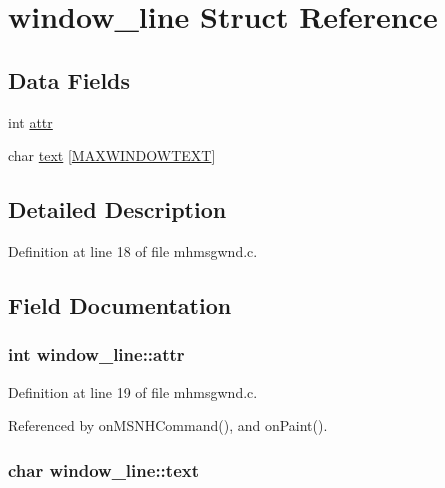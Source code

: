 \hypertarget{structwindow__line}{\section{window\+\_\+line Struct Reference}
\label{structwindow__line}
}
\subsection*{Data Fields}
\begin{DoxyCompactItemize}
\item 
int \hyperlink{structwindow__line_a58077cb852250ed547bc6cfd0310db23}{attr}
\item 
char \hyperlink{structwindow__line_a080d799babb8e16480b257e64df3d660}{text} \mbox{[}\hyperlink{win_2win32_2mhstatus_8c_a7823f335c74115317a5e71c645dae320}{M\+A\+X\+W\+I\+N\+D\+O\+W\+T\+E\+X\+T}\mbox{]}
\end{DoxyCompactItemize}


\subsection{Detailed Description}


Definition at line 18 of file mhmsgwnd.\+c.



\subsection{Field Documentation}
\hypertarget{structwindow__line_a58077cb852250ed547bc6cfd0310db23}{
\subsubsection[{attr}]{\setlength{\rightskip}{0pt plus 5cm}int window\+\_\+line\+::attr}}\label{structwindow__line_a58077cb852250ed547bc6cfd0310db23}


Definition at line 19 of file mhmsgwnd.\+c.



Referenced by on\+M\+S\+N\+H\+Command(), and on\+Paint().

\hypertarget{structwindow__line_a080d799babb8e16480b257e64df3d660}{
\subsubsection[{text}]{\setlength{\rightskip}{0pt plus 5cm}char window\+\_\+line\+::text}}\label{structwindow__line_a080d799babb8e16480b257e64df3d660}


